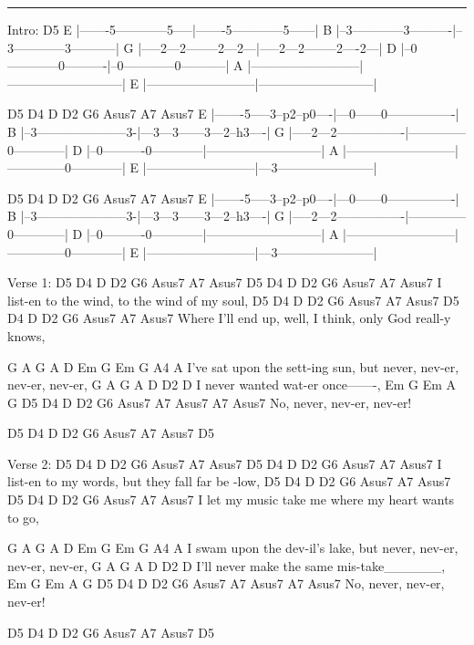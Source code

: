 \noindent\rule{\columnwidth}{1pt}

\begin{lsttab}
Intro:
    D5
E |-------5------------5-----|-------5------------5------|
B |--3------------3----------|--3------------3-----------|
G |-----2---2--------2---2---|-----2---2--------2----2---|
D |--0------------0----------|--0------------0-----------|
A |--------------------------|---------------------------|
E |--------------------------|---------------------------|

     D5        D4   D   D2       G6       Asus7 A7 Asus7
E |-------5-----3--p2--p0----|---0------0----------------|
B |--3---------------------3-|---3---3------3---2--h3----|
G |-----2---2----------------|--------------0------------|
D |--0----------0------------|---------------------------|
A |--------------------------|--------------0------------|
E |--------------------------|---3-----------------------|

     D5        D4   D   D2       G6       Asus7 A7 Asus7
E |-------5-----3--p2--p0----|---0------0----------------|
B |--3---------------------3-|---3---3------3---2--h3----|
G |-----2---2----------------|--------------0------------|
D |--0----------0------------|---------------------------|
A |--------------------------|--------------0------------|
E |--------------------------|---3-----------------------|  
\end{lsttab}

\begin{lstsong}
Verse 1:
D5   D4  D  D2      G6          Asus7 A7 Asus7  D5           D4 D D2  G6  Asus7  A7 Asus7
  I list-en to the wind, to the wind  of  my   soul,
D5           D4  D   D2      G6         Asus7 A7 Asus7 D5    D4 D D2  G6  Asus7  A7 Asus7
  Where I'll end up, well, I think, only God reall-y knows,
    
G       A            G    A   D  Em       G       Em       G   A4  A
  I've sat upon the sett-ing sun,   but never, nev-er, nev-er, nev-er,
G      A           G  A   D   D2  D
   I never wanted wat-er once-------, 
Em        G    Em  A    G  D5 D4 D D2  G6  Asus7   A7 Asus7  A7 Asus7
    No, never, nev-er, nev-er!

D5 D4 D D2  G6  Asus7   A7 Asus7  D5

Verse 2:
D5    D4  D  D2      G6           Asus7 A7 Asus7  D5     D4 D D2  G6  Asus7  A7 Asus7
   I list-en to my words, but they fall far   be -low,
D5    D4 D   D2    G6              Asus7  A7  Asus7 D5   D4 D D2  G6  Asus7  A7 Asus7
   I let my music take me where my heart wants to   go,

G      A            G   A     D  Em       G       Em       G   A4  A
   I swam upon the dev-il's lake,   but never, nev-er, nev-er, nev-er,
G         A              G   A   D   D2  D
   I'll never make the same mis-take______, 
Em        G    Em  A    G  D5 D4 D D2  G6  Asus7   A7 Asus7   A7 Asus7
    No, never, nev-er, nev-er!

D5 D4 D D2  G6   Asus7   A7 Asus7  D5
\end{lstsong}
\newpage

